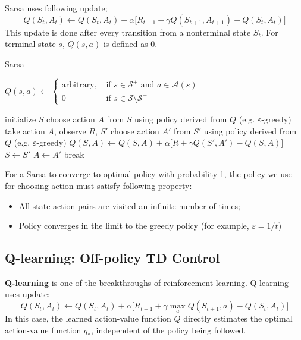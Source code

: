 \documentclass[../../main.tex]{subfiles}
\begin{document}
        Sarsa uses following update;
        \begin{equation}
            Q(S_t,A_t) \leftarrow Q(S_t,A_t) + \alpha \Big[ R_{t+1} + \gamma Q(S_{t+1},A_{t+1}) - Q(S_t,A_t) \Big]\label{eq:sarsa}
        \end{equation}
        This update is done after every transition from a nonterminal state $S_t$. For terminal state $s$, $Q(s,a)$ is defined as 0.

        {Sarsa}
        {\inputitem{$\alpha \in (0,1]$}{step size parameter}}
        {}
        {
            {$Q(s,a) \leftarrow
            \begin{cases}
                \text{arbitrary,} &\text{ if $s \in \mathcal{S}^+$ and $a \in \mathcal{A}(s)$} \\
                0 &\text{ if $s \in \mathcal{S} \setminus \mathcal{S}^+$}
            \end{cases}$\;}

            {
                initialize $S$\;
                choose action $A$ from $S$ using policy derived from $Q$ (e.g. $\varepsilon$-greedy)\;
                {
                    take action $A$, observe $R$, $S'$\;
                    choose action $A'$ from $S'$ using policy derived from $Q$ (e.g. $\varepsilon$-greedy)\;
                    $Q(S,A) \leftarrow Q(S,A) + \alpha \big[ R + \gamma Q(S',A') - Q(S,A) \big]$\;
                    $S \leftarrow S'$\;
                    $A \leftarrow A'$\;
                    {
                        break
                    }
                }
            }
        }

        For a Sarsa to converge to optimal policy with probability 1, the policy we use for choosing action must satisfy following property:
        \begin{itemize}
            \item All state-action pairs are visited an infinite number of times;
            \item Policy converges in the limit to the greedy policy (for example, $\varepsilon=1/t$)
        \end{itemize}

    \subsection{Q-learning: Off-policy TD Control}
        \textbf{Q-learning} is one of the breakthroughs of reinforcement learning. Q-learning uses update:
        \begin{equation}
            Q(S_t,A_t) \leftarrow Q(S_t,A_t) + \alpha\Big[ R_{t+1} + \gamma \max_a{Q(S_{t+1}, a)} - Q(S_t,A_t) \Big]
        \end{equation}
        In this case, the learned action-value function $Q$ directly estimates the optimal action-value function $q_*$,
        independent of the policy being followed.
\end{document}
